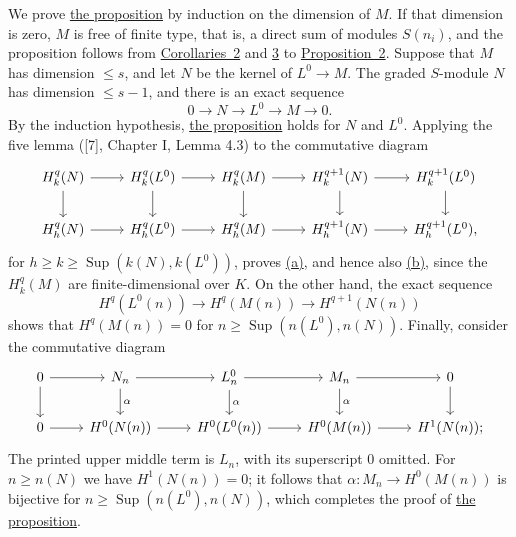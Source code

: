 We prove \hyperref[fac:III:3:no:63:prop:3]{the proposition} by induction
on the dimension of $M$. If that
dimension is zero, $M$ is free of finite type, that is, a direct sum of
modules $S(n_i)$, and the proposition follows from
\hyperref[fac:III:3:no:62:cor:2]{Corollaries~2} and
\hyperref[fac:III:3:no:62:cor:3]{3} to
\hyperref[fac:III:3:no:62:prop:2]{Proposition~2}. Suppose that $M$
has dimension $\leq s$, and let $N$ be the kernel of $L^0\to M$. The
graded $S$-module $N$ has dimension $\leq s-1$, and there is an exact
sequence
\label{fac:III:3:no:63:formula:short-exact}
\[
0\longrightarrow N\longrightarrow L^0\longrightarrow M
\longrightarrow0.
\]
By the induction hypothesis,
\hyperref[fac:III:3:no:63:prop:3]{the proposition} holds for $N$ and $L^0$.
Applying the five lemma ([7], Chapter I, Lemma 4.3) to the commutative
diagram
\label{fac:III:3:no:63:diagram:five-lemma}
\[
\begin{tikzcd}
H_k^q(N) \arrow[r] \arrow[d] & H_k^q(L^0) \arrow[r] \arrow[d]
  & H_k^q(M) \arrow[r] \arrow[d] & H_k^{q+1}(N) \arrow[r] \arrow[d]
  & H_k^{q+1}(L^0) \arrow[d] \\
H_h^q(N) \arrow[r] & H_h^q(L^0) \arrow[r] & H_h^q(M) \arrow[r]
  & H_h^{q+1}(N) \arrow[r] & H_h^{q+1}(L^0),
\end{tikzcd}
\]
for $h\geq k\geq\operatorname{Sup}(k(N),k(L^0))$, proves
\hyperref[fac:III:3:no:63:prop:3:item:a]{(a)}, and hence also
\hyperref[fac:III:3:no:63:prop:3:item:b]{(b)}, since the $H_k^q(M)$ are
finite-dimensional over $K$.
On the other hand, the exact sequence
\label{fac:III:3:no:63:formula:cohomology-segment}
\[
H^q(L^0(n))\longrightarrow H^q(M(n))\longrightarrow H^{q+1}(N(n))
\]
shows that $H^q(M(n))=0$ for
$n\geq\operatorname{Sup}(n(L^0),n(N))$. Finally, consider the
commutative diagram
\label{fac:III:3:no:63:diagram:alpha}
\[
\begin{tikzcd}
0 \arrow[r] \arrow[d] & N_n \arrow[r] \arrow[d,"\alpha"]
  & L_n^0 \arrow[r] \arrow[d,"\alpha"]
  & M_n \arrow[r] \arrow[d,"\alpha"] & 0 \arrow[d] \\
0 \arrow[r] & H^0(N(n)) \arrow[r] & H^0(L^0(n)) \arrow[r]
  & H^0(M(n)) \arrow[r] & H^1(N(n));
\end{tikzcd}
\]
The printed upper middle term is $L_n$, with its superscript $0$
omitted. For $n\geq n(N)$ we have $H^1(N(n))=0$; it follows that
$\alpha:M_n\to H^0(M(n))$ is bijective for
$n\geq\operatorname{Sup}(n(L^0),n(N))$, which completes the proof of
\hyperref[fac:III:3:no:63:prop:3]{the proposition}.
